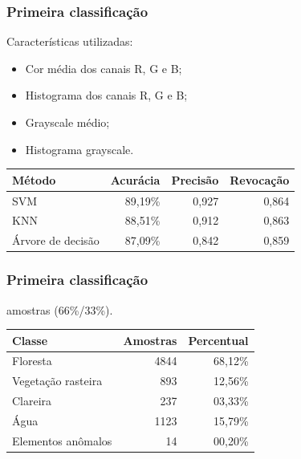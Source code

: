 \documentclass[t]{beamer}
\begin{document}
\begin{frame}
	\frametitle{Primeira classificação}

	Características utilizadas:
	\begin{itemize}
		\item Cor média dos canais R, G e B;
		\item Histograma dos canais R, G e B;
		\item Grayscale médio;
		\item Histograma grayscale.
	\end{itemize}





	\small{
	\begin{table}[h]
	\centering
	\begin{tabulary}{\linewidth}{|L|R|R|R|}
		\hline
		\textbf{Método} & \textbf{Acurácia} & \textbf{Precisão} & \textbf{Revocação} \\ \hline
		SVM               & 89,19\% & 0,927 & 0,864 \\ \hline
		KNN               & 88,51\% & 0,912 & 0,863 \\ \hline
		Árvore de decisão & 87,09\% & 0,842 & 0,859 \\ \hline
	\end{tabulary}
	\end{table}
	}

\end{frame}

\begin{frame}
	\frametitle{Primeira classificação}

	 amostras (66\%/33\%).

	\small{
	\begin{table}[h]
	\centering
	\begin{tabulary}{\linewidth}{|L|R|R|}
		\hline
		\textbf{Classe} & \textbf{Amostras} & \textbf{Percentual} \\ \hline
		Floresta           & 4844 & 68,12\% \\ \hline
		Vegetação rasteira & 893  & 12,56\% \\ \hline
		Clareira           & 237  & 03,33\% \\ \hline
		Água               & 1123 & 15,79\% \\ \hline
		Elementos anômalos & 14   & 00,20\% \\ \hline
	\end{tabulary}
	\end{table}
	}

\end{frame}
\end{document}
